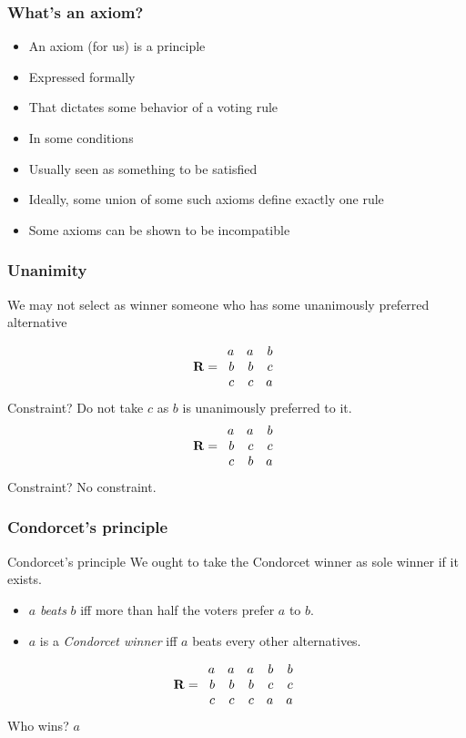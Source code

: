 \documentclass[french,english]{beamer}
\begin{document}
\begin{frame}
	\frametitle{What’s an axiom?}
	\begin{itemize}
		\item An axiom (for us) is a principle
		\item Expressed formally
		\item That dictates some behavior of a voting rule
		\item In some conditions
		\item Usually seen as something to be satisfied
		\item Ideally, some union of some such axioms define exactly one rule
		\item Some axioms can be shown to be incompatible
	\end{itemize}
\end{frame}

\begin{frame}
	\frametitle{Unanimity}
	\begin{definition}[Unanimity]
		We may not select as winner someone who has some unanimously preferred alternative
	\end{definition}
	\begin{equation}
		\mathbf{R} =
		\begin{array}{rrr}
			a	&	a	&	b\\
			b	&	b	&	c\\
			c	&	c	&	a
		\end{array}
	\end{equation}
	Constraint? \pause Do not take $c$ as $b$ is unanimously preferred to it.	\pause
	\begin{equation}
		\mathbf{R} =
		\begin{array}{rrr}
			a	&	a	&	b\\
			b	&	c	&	c\\
			c	&	b	&	a
		\end{array}
	\end{equation}
	Constraint? \pause No constraint.
\end{frame}

\begin{frame}
	\frametitle{Condorcet’s principle}
	\begin{block}{Condorcet’s principle}
		We ought to take the Condorcet winner as sole winner if it exists.
		\begin{itemize}
			\item $a$ \emph{beats} $b$ iff more than half the voters prefer $a$ to $b$.
			\item $a$ is a \emph{Condorcet winner} iff $a$ beats every other alternatives.
		\end{itemize}
	\end{block}
	\vfill
	\begin{equation}
		\mathbf{R} =
		\begin{array}{rrrrr}
			a	&	a	&	a	&	b	&	b\\
			b	&	b	&	b	&	c	&	c\\
			c	&	c	&	c	&	a	&	a
		\end{array}
	\end{equation}
	 Who wins? \pause $a$
\end{frame}
\end{document}
